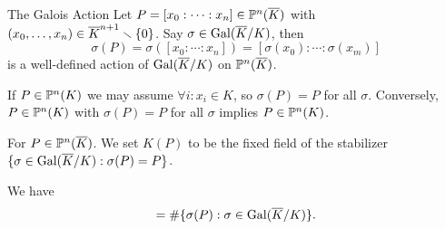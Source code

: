 \documentclass{beamer}
\begin{document}
\begin{frame}{The Galois Action}
  Let
  $P=[x_0:\cdots:x_n]\in {\mathbb{P}}^n(\overline{K})$ with  $(x_0,\ldots,x_n) \in
  \overline{K}^{n+1}\smallsetminus\{0\}$.
  Say $\sigma\in \mathrm{Gal}(\overline{K}/K)$, then
  \begin{equation*}
    \sigma(P)=  \sigma([x_0:\cdots:x_n]) = [\sigma(x_0):\cdots:\sigma(x_m)]
  \end{equation*}
  is a well-defined action of $\mathrm{Gal}(\overline{K}/K)$ on ${\mathbb{P}}^n(\overline K)$.

  If $P\in {\mathbb{P}}^n(K)$ we may assume $\forall i:x_i\in K$, so
  $\sigma(P)=P$ for all $\sigma$.
  Conversely, 
  $P\in {\mathbb{P}}^n(K)$ with $\sigma(P)=P$ for all $\sigma$ implies
  $P\in {\mathbb{P}}^n(K)$.

  \begin{definition}
    For $P\in {\mathbb{P}}^n(\overline K)$. 
    We set $K(P)$ to be the fixed field of the stabilizer
    $\{\sigma\in \mathrm{Gal}(\overline{K}/K) : \sigma(P)=P\}$. 
  \end{definition}

  We have
  \begin{equation*}
    [K(P):K]  = \#\{\sigma(P) : \sigma\in\absgalk \}. 
  \end{equation*}

\end{frame}
\end{document}
